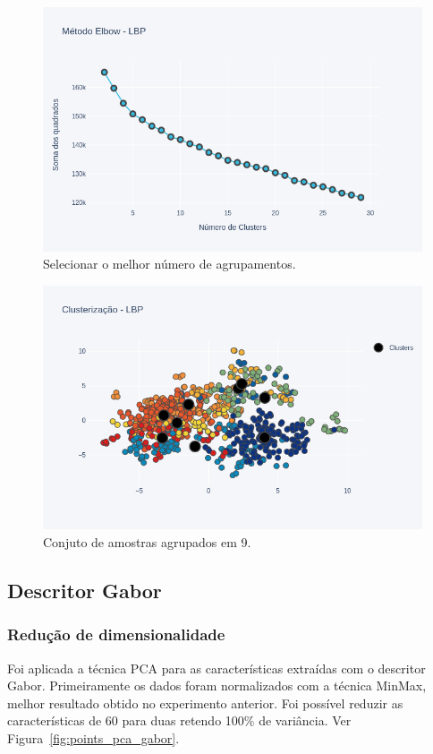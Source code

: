\documentclass[a4paper, 12 pt, conference]{ieeeconf}  %
\begin{document}
\begin{figure}[!htbp]
	\centering
	\includegraphics[width=1.0\linewidth,clip=true,trim=0cm 0cm 0cm 0cm, keepaspectratio=true]{points_elbow_lbp.png}
	\caption{Selecionar o melhor número de agrupamentos.}
	\label{fig:points_elbow_lbp}
\end{figure}

\begin{figure}[!htbp]
	\centering
	\includegraphics[width=1.0\linewidth,clip=true,trim=0cm 0cm 0cm 0cm, keepaspectratio=true]{scatter_k9_lbp.png}
	\caption{Conjuto de amostras agrupados em 9.}
	\label{fig:scatter_k9_lbp}
\end{figure}

\subsection{Descritor Gabor}
\subsubsection{Redução de dimensionalidade}
Foi aplicada a técnica PCA para as características extraídas com o descritor Gabor. Primeiramente os dados  foram normalizados com a técnica MinMax, melhor resultado obtido no experimento anterior. Foi possível reduzir as características de 60 para duas retendo 100\% de variância. Ver  Figura~\ref{fig:points_pca_gabor}.
\end{document}
